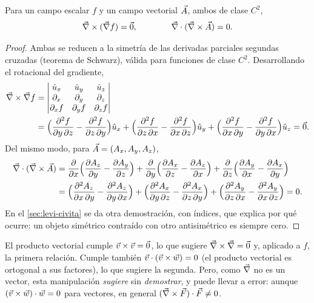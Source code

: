 \begin{proposicion}\label{prop:fundamentales}
Para un campo escalar $f$ y un campo vectorial $\vec{A}$, ambos de clase $C^{2}$,
\begin{equation}\label{eq:rotgrad}
  \vec{\nabla}\times(\vec{\nabla} f)=\vec{0},
  \qquad\qquad
  \vec{\nabla}\cdot(\vec{\nabla}\times\vec{A})=0 .
\end{equation}
\end{proposicion}
\begin{proof}
Ambas se reducen a la simetría de las derivadas parciales segundas
cruzadas (teorema de Schwarz), válida para funciones de clase $C^{2}$.
Desarrollando el rotacional del gradiente,
\begin{align*}
  \vec{\nabla}\times\vec{\nabla} f&=
  \begin{vmatrix}
    \hat{u}_{x} & \hat{u}_{y} & \hat{u}_{z}\\
    \partial_x & \partial_y & \partial_z\\
    \partial_xf & \partial_yf & \partial_zf
  \end{vmatrix}
  \\&=\Bigl(\frac{\partial^{2} f}{\partial y\,\partial z}-\frac{\partial^{2} f}{\partial z\,\partial y}\Bigr)\hat{u}_{x}
   +\Bigl(\frac{\partial^{2} f}{\partial z\,\partial x}-\frac{\partial^{2} f}{\partial x\,\partial z}\Bigr)\hat{u}_{y}
   +\Bigl(\frac{\partial^{2} f}{\partial x\,\partial y}-\frac{\partial^{2} f}{\partial y\,\partial x}\Bigr)\hat{u}_{z}=\vec{0}.
\end{align*}
Del mismo modo, para $\vec{A}=(A_x,A_y,A_z)$,
\begin{align*}
  \vec{\nabla}\cdot(\vec{\nabla}\times\vec{A})
  &=\frac{\partial }{\partial x}\Bigl(\frac{\partial A_z}{\partial y}-\frac{\partial A_y}{\partial z}\Bigr)
   +\frac{\partial }{\partial y}\Bigl(\frac{\partial A_x}{\partial z}-\frac{\partial A_z}{\partial x}\Bigr)
   +\frac{\partial }{\partial z}\Bigl(\frac{\partial A_y}{\partial x}-\frac{\partial A_x}{\partial y}\Bigr)\\
  &=\Bigl(\frac{\partial^{2} A_z}{\partial x\,\partial y}-\frac{\partial^{2} A_z}{\partial y\,\partial x}\Bigr)
   +\Bigl(\frac{\partial^{2} A_x}{\partial y\,\partial z}-\frac{\partial^{2} A_x}{\partial z\,\partial y}\Bigr)
   +\Bigl(\frac{\partial^{2} A_y}{\partial z\,\partial x}-\frac{\partial^{2} A_y}{\partial x\,\partial z}\Bigr)=0 .
\end{align*}
En el \cref{sec:levi-civita} se da otra demostración, con índices, que
explica por qué ocurre: un objeto simétrico contraído con otro antisimétrico
es siempre cero.
\end{proof}

\begin{observacion}\label{obs:mnemo}
El producto vectorial cumple $\vec{v}\times\vec{v}=\vec{0}$, lo que sugiere
$\vec{\nabla}\times\vec{\nabla}=\vec{0}$ y, aplicado a $f$, la primera relación. Cumple también
$\vec{v}\cdot(\vec{v}\times\vec{w})=0$ (el producto vectorial es ortogonal a sus
factores), lo que sugiere la segunda. Pero, como $\vec{\nabla}$ no es un vector, esta
manipulación \emph{sugiere} sin \emph{demostrar}, y puede llevar a error:
aunque $(\vec{v}\times\vec{w})\cdot\vec{w}=0$ para vectores, en general
$(\vec{\nabla}\times\vec{F})\cdot\vec{F}\neq0$.
\end{observacion}

